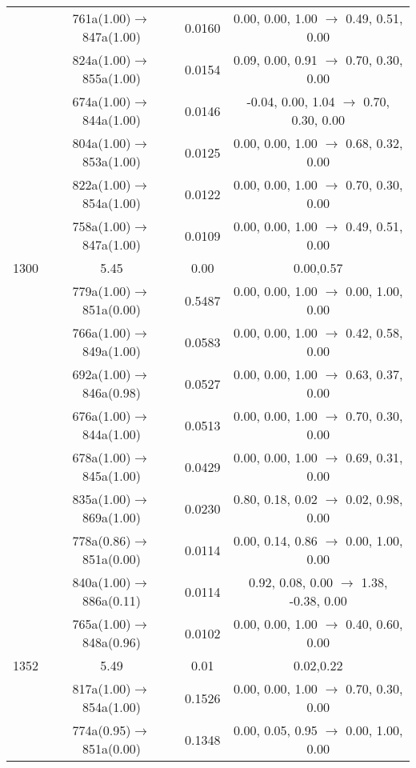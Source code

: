 \documentclass[10pt,a4paper]{article}
\begin{document}
\begin{longtable}{c|c|c|c}
 	& 761a(1.00)$\rightarrow$847a(1.00) &	 0.0160 &	 0.00, 0.00, 1.00 $\rightarrow$ 0.49, 0.51, 0.00 \\ 
 	& 824a(1.00)$\rightarrow$855a(1.00) &	 0.0154 &	 0.09, 0.00, 0.91 $\rightarrow$ 0.70, 0.30, 0.00 \\ 
 	& 674a(1.00)$\rightarrow$844a(1.00) &	 0.0146 &	 -0.04, 0.00, 1.04 $\rightarrow$ 0.70, 0.30, 0.00 \\ 
 	& 804a(1.00)$\rightarrow$853a(1.00) &	 0.0125 &	 0.00, 0.00, 1.00 $\rightarrow$ 0.68, 0.32, 0.00 \\ 
 	& 822a(1.00)$\rightarrow$854a(1.00) &	 0.0122 &	 0.00, 0.00, 1.00 $\rightarrow$ 0.70, 0.30, 0.00 \\ 
 	& 758a(1.00)$\rightarrow$847a(1.00) &	 0.0109 &	 0.00, 0.00, 1.00 $\rightarrow$ 0.49, 0.51, 0.00 \\ 
 \hline1300 &	 5.45 &	 0.00 &	 0.00,0.57 \\ 
  	& 779a(1.00)$\rightarrow$851a(0.00) &	 0.5487 &	 0.00, 0.00, 1.00 $\rightarrow$ 0.00, 1.00, 0.00 \\ 
 	& 766a(1.00)$\rightarrow$849a(1.00) &	 0.0583 &	 0.00, 0.00, 1.00 $\rightarrow$ 0.42, 0.58, 0.00 \\ 
 	& 692a(1.00)$\rightarrow$846a(0.98) &	 0.0527 &	 0.00, 0.00, 1.00 $\rightarrow$ 0.63, 0.37, 0.00 \\ 
 	& 676a(1.00)$\rightarrow$844a(1.00) &	 0.0513 &	 0.00, 0.00, 1.00 $\rightarrow$ 0.70, 0.30, 0.00 \\ 
 	& 678a(1.00)$\rightarrow$845a(1.00) &	 0.0429 &	 0.00, 0.00, 1.00 $\rightarrow$ 0.69, 0.31, 0.00 \\ 
 	& 835a(1.00)$\rightarrow$869a(1.00) &	 0.0230 &	 0.80, 0.18, 0.02 $\rightarrow$ 0.02, 0.98, 0.00 \\ 
 	& 778a(0.86)$\rightarrow$851a(0.00) &	 0.0114 &	 0.00, 0.14, 0.86 $\rightarrow$ 0.00, 1.00, 0.00 \\ 
 	& 840a(1.00)$\rightarrow$886a(0.11) &	 0.0114 &	 0.92, 0.08, 0.00 $\rightarrow$ 1.38, -0.38, 0.00 \\ 
 	& 765a(1.00)$\rightarrow$848a(0.96) &	 0.0102 &	 0.00, 0.00, 1.00 $\rightarrow$ 0.40, 0.60, 0.00 \\ 
 \hline1352 &	 5.49 &	 0.01 &	 0.02,0.22 \\ 
  	& 817a(1.00)$\rightarrow$854a(1.00) &	 0.1526 &	 0.00, 0.00, 1.00 $\rightarrow$ 0.70, 0.30, 0.00 \\ 
 	& 774a(0.95)$\rightarrow$851a(0.00) &	 0.1348 &	 0.00, 0.05, 0.95 $\rightarrow$ 0.00, 1.00, 0.00 \\ 

\end{longtable}
\end{document}
